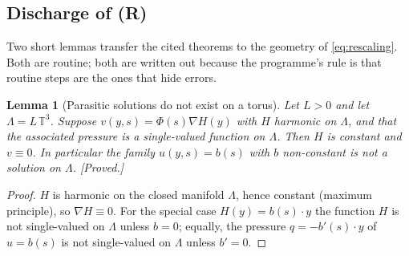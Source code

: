 \documentclass[11pt]{article}
\newtheorem{lemma}[theorem]{Lemma}
\theoremstyle{definition}
\theoremstyle{remark}
\newcommand{\T}{\mathbb{T}}
\begin{document}
\subsection{Discharge of (R)}
\label{subsec:s48-discharge}

Two short lemmas transfer the cited theorems to the geometry of
\eqref{eq:rescaling}. Both are routine; both are written out because the
programme's rule is that routine steps are the ones that hide errors.

\begin{lemma}[Parasitic solutions do not exist on a torus]
  \label{lem:s48-no-parasites}
  Let $L>0$ and let $\Lambda=L\,\T^3$. Suppose $v(y,s)=\Phi(s)\nabla H(y)$
  with $H$ harmonic on $\Lambda$, and that the associated pressure is a
  single-valued function on $\Lambda$. Then $H$ is constant and $v\equiv0$.
  In particular the family $u(y,s)=b(s)$ with $b$ non-constant is not a
  solution on $\Lambda$. \emph{[Proved.]}
\end{lemma}
\begin{proof}
  $H$ is harmonic on the closed manifold $\Lambda$, hence constant (maximum
  principle), so $\nabla H\equiv0$. For the special case $H(y)=b(s)\cdot y$
  the function $H$ is not single-valued on $\Lambda$ unless $b=0$; equally,
  the pressure $q=-b'(s)\cdot y$ of $u=b(s)$ is not single-valued on
  $\Lambda$ unless $b'=0$.
\end{proof}
\end{document}
